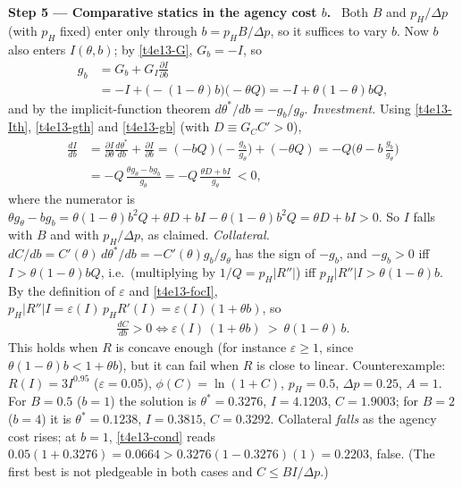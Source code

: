 \documentclass[11pt,a4paper]{article}
\newcommand{\step}[2]{\par\medskip\noindent\textbf{Step #1 --- #2.}~}
\begin{document}
\step{5}{Comparative statics in the agency cost $b$} Both $B$ and $p_H/\Delta p$ (with $p_H$ fixed)
enter only through $b=p_HB/\Delta p$, so it suffices to vary $b$. Now $b$ also enters $I(\theta,b)$; by
\eqref{t4e13-G}, $G_b=-I$, so
\begin{align}
  g_b &= G_b+G_I\frac{\partial I}{\partial b} \nonumber\\
      &= -I+\big(-(1-\theta)b\big)\big(-\theta Q\big) = -I+\theta(1-\theta)bQ, \label{t4e13-gb}
\end{align}
and by the implicit-function theorem $d\theta^*/db=-g_b/g_\theta$.
\emph{Investment.} Using \eqref{t4e13-Ith}, \eqref{t4e13-gth} and \eqref{t4e13-gb} (with $D\equiv G_CC'>0$),
\begin{align}
  \frac{dI}{db} &= \frac{\partial I}{\partial\theta}\frac{d\theta^*}{db}+\frac{\partial I}{\partial b}
               = (-bQ)\Big(-\frac{g_b}{g_\theta}\Big)+(-\theta Q)
               = -Q\Big(\theta-b\,\frac{g_b}{g_\theta}\Big) \nonumber\\
               &= -Q\,\frac{\theta g_\theta-bg_b}{g_\theta}
               = -Q\,\frac{\theta D+bI}{g_\theta}\ <0, \label{t4e13-Ib}
\end{align}
where the numerator is
$\theta g_\theta-bg_b=\theta(1-\theta)b^2Q+\theta D+bI-\theta(1-\theta)b^2Q=\theta D+bI>0$.
So $I$ falls with $B$ and with $p_H/\Delta p$, as claimed. \emph{Collateral.} $dC/db=C'(\theta)\,d\theta^*/db
=-C'(\theta)g_b/g_\theta$ has the sign of $-g_b$, and $-g_b>0$ iff $I>\theta(1-\theta)bQ$, i.e.\
(multiplying by $1/Q=p_H|R''|$) iff $p_H|R''|I>\theta(1-\theta)b$. By the definition of $\varepsilon$
and \eqref{t4e13-focI}, $p_H|R''|I=\varepsilon(I)\,p_HR'(I)=\varepsilon(I)(1+\theta b)$, so
\begin{align}
  \frac{dC}{db}>0 \iff \varepsilon(I)\,(1+\theta b)\ >\ \theta(1-\theta)\,b. \label{t4e13-cond}
\end{align}
This holds when $R$ is concave enough (for instance $\varepsilon\ge1$, since $\theta(1-\theta)b<1+\theta b$),
but it can fail when $R$ is close to linear. Counterexample: $R(I)=3I^{0.95}$ ($\varepsilon=0.05$),
$\phi(C)=\ln(1+C)$, $p_H=0.5$, $\Delta p=0.25$, $A=1$. For $B=0.5$ ($b=1$) the solution is
$\theta^*=0.3276$, $I=4.1203$, $C=1.9003$; for $B=2$ ($b=4$) it is $\theta^*=0.1238$, $I=0.3815$,
$C=0.3292$. Collateral \emph{falls} as the agency cost rises; at $b=1$, \eqref{t4e13-cond} reads
$0.05(1+0.3276)=0.0664>0.3276(1-0.3276)(1)=0.2203$, false. (The first best is not pledgeable in both
cases and $C\le BI/\Delta p$.)
\end{document}
